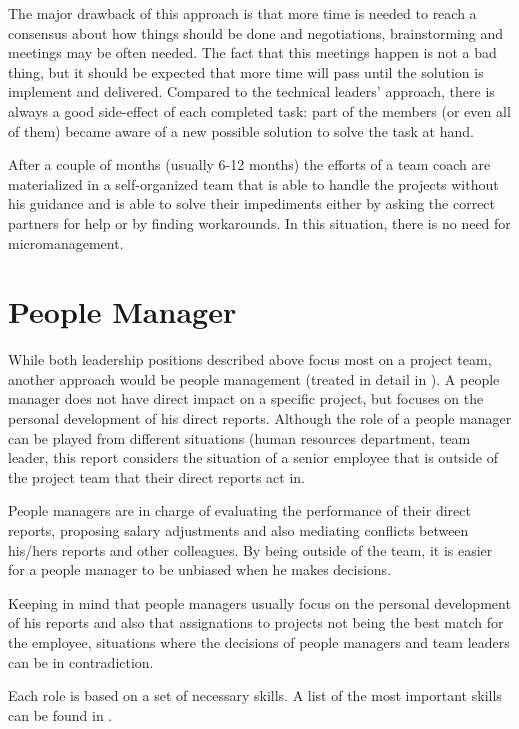 The major drawback of this approach is that more time is needed to reach a consensus about how things should be done and negotiations, brainstorming and meetings may be often needed. The fact that this meetings happen is not a bad thing, but it should be expected that more time will pass until the solution is implement and delivered. Compared to the technical leaders' approach, there is always a good side-effect of each completed task: part of the members (or even all of them) became aware of a new possible solution to solve the task at hand. 

After a couple of months (usually 6-12 months) the efforts of a team coach are materialized in a self-organized team that is able to handle the projects without his guidance and is able to solve their impediments either by asking the correct partners for help or by finding workarounds. In this situation, there is no need for micromanagement.

\section{People Manager}
\label{sec:pm}
While both leadership positions described above focus most on a project team, another approach would be people management (treated in detail in \cite{abur-pm}). A people manager does not have direct impact on a specific project, but focuses on the personal development of his direct reports. Although the role of a people manager can be played from different situations (human resources department, team leader, this report considers the situation of a senior employee that is outside of the project team that their direct reports act in. 

People managers are in charge of evaluating the performance of their direct reports, proposing salary adjustments and also mediating conflicts between his/hers reports and other colleagues. By being outside of the team, it is easier for a people manager to be unbiased when he makes decisions.

Keeping in mind that people managers usually focus on the personal development of his reports and also that assignations to projects not being the best match for the employee, situations where the decisions of people managers and team leaders can be in contradiction. 

Each role is based on a set of necessary skills. A list of the most important skills can be found in .

